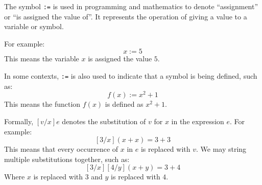 \newpage







\begin{Def}[Symbol ``\texttt{:=}'']

    The symbol \texttt{:=} is used in programming and mathematics to denote ``assignment'' or ``is assigned the value of''. 
    It represents the operation of giving a value to a variable or symbol.

    \vspace{1em}
    \noindent
    For example:
    \[
    x := 5
    \]
    This means the variable $x$ is assigned the value $5$.

    \vspace{1em}
    \noindent
    In some contexts, \texttt{:=} is also used to indicate that a symbol is being defined, such as:
    \[
    f(x) := x^2 + 1
    \]
    This means the function $f(x)$ is defined as $x^2 + 1$.
\end{Def}

\begin{Def}
    
    \label{def:substitution}
    Formally, $[v/x]e$ denotes the substitution of $v$ for $x$ in the expression $e$.
    For example:
    \[
    [3/x](x + x) = 3 + 3
    \]
    This means that every occurrence of $x$ in $e$ is replaced with $v$. We may string multiple substitutions together,
    such as:
    \[
    [3/x][4/y](x + y) = 3 + 4
    \]
    Where $x$ is replaced with $3$ and $y$ is replaced with $4$.
\end{Def}



